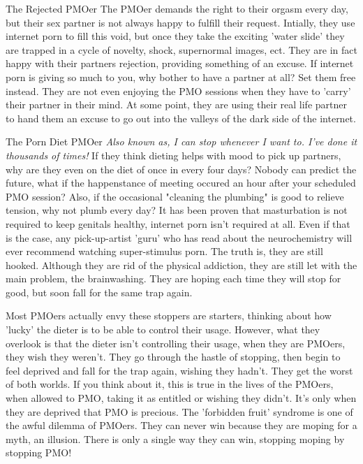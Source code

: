 The Rejected PMOer
The PMOer demands the right to their orgasm every day, but their sex partner is not always happy to fulfill their request. Intially, they use internet porn to fill this void, but once they take the exciting 'water slide' they are trapped in a cycle of novelty, shock, supernormal images, ect. They are in fact happy with their partners rejection, providing something of an excuse. If internet porn is giving so much to you, why bother to have a partner at all? Set them free instead. They are not even enjoying the PMO sessions when they have to 'carry' their partner in their mind. At some point, they are using their real life partner to hand them an excuse to go out into the valleys of the dark side of the internet.

The Porn Diet PMOer
  \textit{Also known as, I can stop whenever I want to. I've done it thousands of times!}
  If they think dieting helps with mood to pick up partners, why are they even on the diet of once in every four days? Nobody can predict the future, what if the happenstance of meeting occured an hour after your scheduled PMO session? Also, if the occasional "cleaning the plumbing" is good to relieve tension, why not plumb every day? It has been proven that masturbation is not required to keep genitals healthy, internet porn isn't required at all. Even if that is the case, any pick-up-artist 'guru' who has read about the neurochemistry will ever recommend watching super-stimulus porn. The truth is, they are still hooked. Although they are rid of the physical addiction, they are still let with the main problem, the brainwashing. They are hoping each time they will stop for good, but soon fall for the same trap again.

  Most PMOers actually envy these stoppers are starters, thinking about how 'lucky' the dieter is to be able to control their usage. However, what they overlook is that the dieter isn't controlling their usage, when they are PMOers, they wish they weren't. They go through the hastle of stopping, then begin to feel deprived and fall for the trap again, wishing they hadn't. They get the worst of both worlds. If you think about it, this is true in the lives of the PMOers, when allowed to PMO, taking it as entitled or wishing they didn't. It's only when they are deprived that PMO is precious. The 'forbidden fruit' syndrome is one of the awful dilemma of PMOers. They can never win because they are moping for a myth, an illusion. There is only a single way they can win, stopping moping by stopping PMO!

